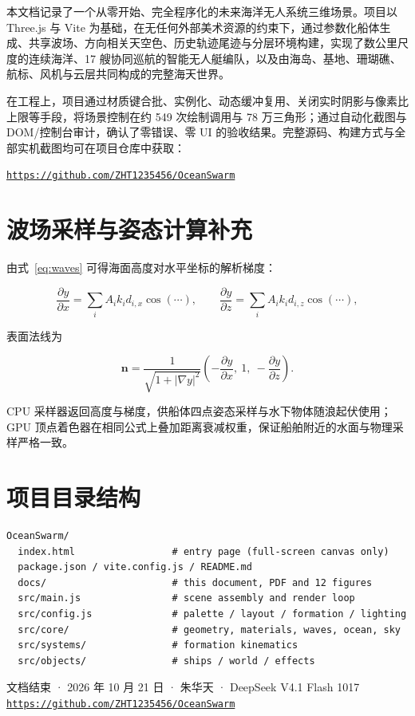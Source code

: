 \documentclass[UTF8, a4paper, 11pt]{ctexart}
\newcommand{\repolink}{\href{https://github.com/ZHT1235456/OceanSwarm}{\texttt{https://github.com/ZHT1235456/OceanSwarm}}}
\begin{document}
本文档记录了一个从零开始、完全程序化的未来海洋无人系统三维场景。项目以 Three.js 与 Vite 为基础，在无任何外部美术资源的约束下，通过参数化船体生成、共享波场、方向相关天空色、历史轨迹尾迹与分层环境构建，实现了数公里尺度的连续海洋、17 艘协同巡航的智能无人艇编队，以及由海岛、基地、珊瑚礁、航标、风机与云层共同构成的完整海天世界。

在工程上，项目通过材质键合批、实例化、动态缓冲复用、关闭实时阴影与像素比上限等手段，将场景控制在约 549 次绘制调用与 78 万三角形；通过自动化截图与 DOM/控制台审计，确认了零错误、零 UI 的验收结果。完整源码、构建方式与全部实机截图均可在项目仓库中获取：

\begin{center}
\repolink
\end{center}

\appendix
\section{波场采样与姿态计算补充}

由式~\eqref{eq:waves} 可得海面高度对水平坐标的解析梯度：

\begin{equation}
\frac{\partial y}{\partial x}=\sum_i A_i k_i d_{i,x}\cos(\cdots),\qquad
\frac{\partial y}{\partial z}=\sum_i A_i k_i d_{i,z}\cos(\cdots),
\end{equation}

表面法线为

\begin{equation}
\mathbf{n}=\frac{1}{\sqrt{1+|\nabla y|^2}}\left(-\frac{\partial y}{\partial x},\ 1,\ -\frac{\partial y}{\partial z}\right).
\end{equation}

CPU 采样器返回高度与梯度，供船体四点姿态采样与水下物体随浪起伏使用；GPU 顶点着色器在相同公式上叠加距离衰减权重，保证船舶附近的水面与物理采样严格一致。

\section{项目目录结构}

\begin{lstlisting}[caption={项目目录结构}, label={lst:tree}]
OceanSwarm/
  index.html                 # entry page (full-screen canvas only)
  package.json / vite.config.js / README.md
  docs/                      # this document, PDF and 12 figures
  src/main.js                # scene assembly and render loop
  src/config.js              # palette / layout / formation / lighting
  src/core/                  # geometry, materials, waves, ocean, sky
  src/systems/               # formation kinematics
  src/objects/               # ships / world / effects
\end{lstlisting}

\vfill
\begin{center}
{\small\color{themegray}
文档结束 · 2026 年 10 月 21 日 · 朱华天 · DeepSeek V4.1 Flash 1017\\[0.3em]
\repolink}
\end{center}
\end{document}
